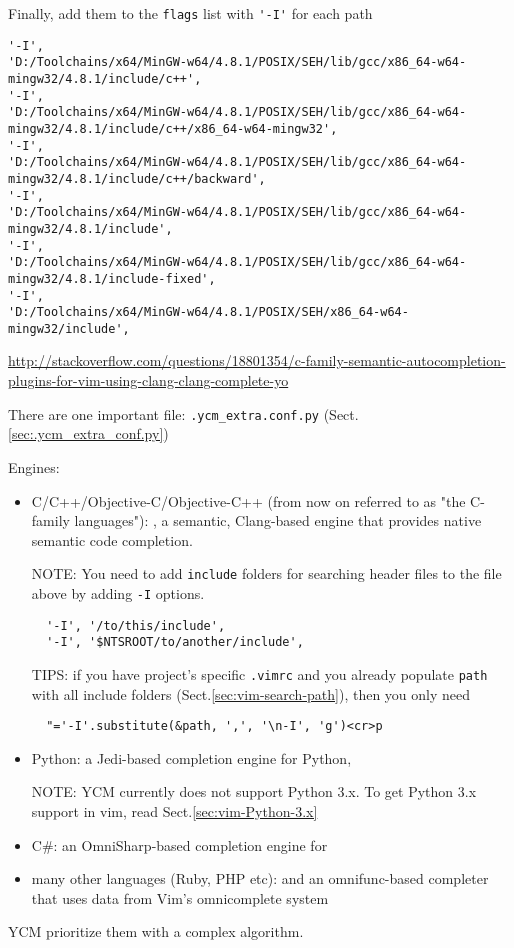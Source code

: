 Finally, add them to the \verb!flags! list with \verb!'-I'! for each path
{\tiny
\begin{verbatim}
'-I',
'D:/Toolchains/x64/MinGW-w64/4.8.1/POSIX/SEH/lib/gcc/x86_64-w64-mingw32/4.8.1/include/c++',
'-I',
'D:/Toolchains/x64/MinGW-w64/4.8.1/POSIX/SEH/lib/gcc/x86_64-w64-mingw32/4.8.1/include/c++/x86_64-w64-mingw32',
'-I',
'D:/Toolchains/x64/MinGW-w64/4.8.1/POSIX/SEH/lib/gcc/x86_64-w64-mingw32/4.8.1/include/c++/backward',
'-I',
'D:/Toolchains/x64/MinGW-w64/4.8.1/POSIX/SEH/lib/gcc/x86_64-w64-mingw32/4.8.1/include',
'-I',
'D:/Toolchains/x64/MinGW-w64/4.8.1/POSIX/SEH/lib/gcc/x86_64-w64-mingw32/4.8.1/include-fixed',
'-I',
'D:/Toolchains/x64/MinGW-w64/4.8.1/POSIX/SEH/x86_64-w64-mingw32/include',
\end{verbatim}
}
\url{http://stackoverflow.com/questions/18801354/c-family-semantic-autocompletion-plugins-for-vim-using-clang-clang-complete-yo}


There are one important file: 
\verb!.ycm_extra.conf.py! (Sect.\ref{sec:.ycm_extra_conf.py})

Engines: 
\begin{itemize}
  \item  C/C++/Objective-C/Objective-C++ (from now on referred to as
"the C-family languages"): , a semantic, Clang-based engine that provides native semantic code
completion.

NOTE: You need to add \verb!include! folders for searching header files to
the file above by adding \verb!-I! options.
  \begin{verbatim}
  '-I', '/to/this/include',
  '-I', '$NTSROOT/to/another/include',
  \end{verbatim}
  
  TIPS: if you have project's specific \verb!.vimrc! and you already populate
  \verb!path! with all include folders (Sect.\ref{sec:vim-search-path}), then
  you only need
  \begin{verbatim}
  "='-I'.substitute(&path, ',', '\n-I', 'g')<cr>p
  \end{verbatim}

 
  \item Python: a Jedi-based completion engine for Python, 

NOTE: YCM currently does not support Python 3.x. To get Python 3.x support
in vim, read Sect.\ref{sec:vim-Python-3.x}

  \item C\#: an
OmniSharp-based completion engine for 

  \item many other languages (Ruby, PHP etc): 
and an omnifunc-based completer
that uses data from Vim's omnicomplete system 
\end{itemize}
YCM prioritize them with a complex algorithm.


